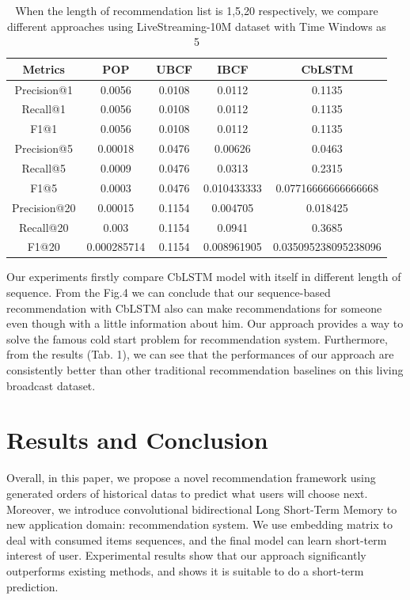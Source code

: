 \documentclass[runningheads]{llncs}
\begin{document}
\begin{table}[htbp]
\begin{center}
\begin{tabular}{|c|c|c|c|c|}
\hline

\textbf{Metrics} & \textbf{POP}& \textbf{UBCF}& \textbf{IBCF}& \textbf{CbLSTM} \\
\hline
Precision@1& 0.0056& 0.0108 & 0.0112 & 0.1135 \\
\hline
Recall@1& 0.0056& 0.0108 & 0.0112 & 0.1135\\
\hline
F1@1& 0.0056& 0.0108 & 0.0112 & 0.1135\\
\hline
Precision@5& 0.00018& 0.0476 & 0.00626 & 0.0463\\
\hline
Recall@5& 0.0009& 0.0476 & 0.0313 & 0.2315\\
\hline
F1@5& 0.0003& 0.0476 & 0.010433333 & 0.07716666666666668\\
\hline
Precision@20& 0.00015& 0.1154 & 0.004705 & 0.018425\\
\hline
Recall@20& 0.003& 0.1154 & 0.0941 & 0.3685\\
\hline
F1@20& 0.000285714& 0.1154 & 0.008961905 & 0.035095238095238096\\
\hline
\end{tabular}
\label{tab1}
\end{center}
\caption{When the length of recommendation list is 1,5,20 respectively, we compare different approaches using LiveStreaming-10M dataset with Time Windows as 5}
\end{table}

Our experiments firstly compare CbLSTM model with itself in different length of sequence. From the Fig.4 we can conclude that our sequence-based recommendation with CbLSTM also can make recommendations for someone even though with a little information about him. Our approach provides a way to solve the famous cold start problem for recommendation system. Furthermore, from the results (Tab. 1), we can see that the performances of our approach are consistently better than other traditional recommendation baselines on this living broadcast dataset.

\section{Results and Conclusion}

Overall, in this paper, we propose a novel recommendation framework using generated orders of historical datas to predict what users will choose next. Moreover, we introduce convolutional bidirectional Long Short-Term Memory to new application domain: recommendation system. We use embedding matrix to deal with consumed items sequences, and the final model can learn short-term interest of user. Experimental results show that our approach significantly outperforms existing methods, and shows it is suitable to do a short-term prediction. 
\end{document}
